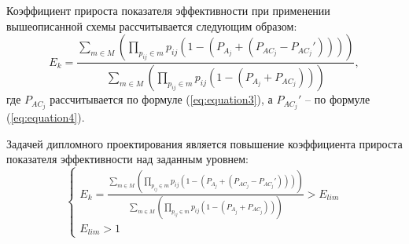 \vspace{\baselineskip}
Коэффициент прироста показателя эффективности при применении вышеописанной схемы рассчитывается следующим образом:
$$
E_k=\frac{\sum_{m \in M} (\prod_{p_{ij} \in m} p_{ij}(1-(P_{A_j}+(P_{{AC}_j}-P_{{AC}_j}'))))}{\sum_{m \in M} (\prod_{p_{ij} \in m} p_{ij}(1-(P_{A_j}+P_{{AC}_j})))},
$$
где $P_{{AC}_j}$ рассчитывается по формуле (\ref{eq:equation3}), а $P_{{AC}_j}'$ -- по формуле (\ref{eq:equation4}).

\vspace{\baselineskip}
Задачей дипломного проектирования является повышение коэффициента прироста показателя  эффективности над заданным уровнем:
$$
\begin{cases}
   E_k=\frac{\sum_{m \in M} (\prod_{p_{ij} \in m} p_{ij}(1-(P_{A_j}+(P_{{AC}_j}-P_{{AC}_j}'))))}{\sum_{m \in M} (\prod_{p_{ij} \in m} p_{ij}(1-(P_{A_j}+P_{{AC}_j})))} > E_{lim} \\
   E_{lim} > 1
  \end{cases}
$$
\clearpage